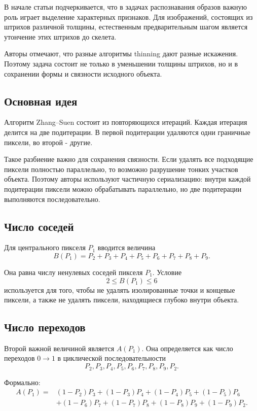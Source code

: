 \documentclass[12pt,a4paper]{article}
\begin{document}
В начале статьи подчеркивается, что в задачах распознавания образов важную роль играет выделение характерных признаков. Для изображений, состоящих из штрихов различной толщины, естественным предварительным шагом является утончение этих штрихов до скелета.

Авторы отмечают, что разные алгоритмы thinning дают разные искажения. Поэтому задача состоит не только в уменьшении толщины штрихов, но и в сохранении формы и связности исходного объекта.

\subsection{Основная идея}

Алгоритм Zhang--Suen состоит из повторяющихся итераций. Каждая итерация делится на две подитерации. В первой подитерации удаляются одни граничные пиксели, во второй - другие.

Такое разбиение важно для сохранения связности. Если удалять все подходящие пиксели полностью параллельно, то возможно разрушение тонких участков объекта. Поэтому авторы используют частичную сериализацию: внутри каждой подитерации пиксели можно обрабатывать параллельно, но две подитерации выполняются последовательно.

\subsection{Число соседей}

Для центрального пикселя $P_1$ вводится величина
\[
    B(P_1)=P_2+P_3+P_4+P_5+P_6+P_7+P_8+P_9.
\]

Она равна числу ненулевых соседей пикселя $P_1$. Условие
\[
    2 \le B(P_1) \le 6
\]
используется для того, чтобы не удалять изолированные точки и концевые пиксели, а также не удалять пиксели, находящиеся глубоко внутри объекта.

\subsection{Число переходов}

Второй важной величиной является $A(P_1)$. Она определяется как число переходов $0\to1$ в циклической последовательности
\[
    P_2, P_3, P_4, P_5, P_6, P_7, P_8, P_9, P_2.
\]

Формально:
\[
\begin{aligned}
A(P_1) ={}&
(1-P_2)P_3 + (1-P_3)P_4 + (1-P_4)P_5 + (1-P_5)P_6 \\
&+ (1-P_6)P_7 + (1-P_7)P_8 + (1-P_8)P_9 + (1-P_9)P_2.
\end{aligned}
\]
\end{document}
